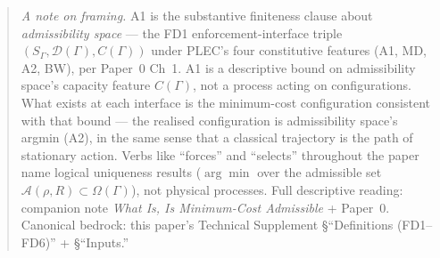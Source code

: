 \documentclass[11pt]{article}
\theoremstyle{remark}
\begin{document}
\begin{abstract}
\smallskip\noindent\textit{A note on framing.} A1 is the substantive finiteness clause about \emph{admissibility space} --- the FD1 enforcement-interface triple $(S_\Gamma, \mathcal{D}(\Gamma), C(\Gamma))$ under PLEC's four constitutive features (A1, MD, A2, BW), per Paper~0 Ch~1. A1 is a descriptive bound on admissibility space's capacity feature $C(\Gamma)$, not a process acting on configurations. What exists at each interface is the minimum-cost configuration consistent with that bound --- the realised configuration is admissibility space's argmin (A2), in the same sense that a classical trajectory is the path of stationary action. Verbs like ``forces'' and ``selects'' throughout the paper name logical uniqueness results ($\arg\min$ over the admissible set $\mathcal{A}(\rho, R) \subset \Omega(\Gamma)$), not physical processes. Full descriptive reading: companion note \emph{What Is, Is Minimum-Cost Admissible} + Paper~0. Canonical bedrock: this paper's Technical Supplement \S``Definitions (FD1--FD6)'' + \S``Inputs.''


\end{abstract}
\end{document}
